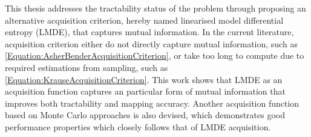 			This thesis addresses the tractability status of the problem through proposing an alternative acquisition criterion, hereby named linearised model differential entropy (LMDE), that captures mutual information. In the current literature, acquisition criterion either do not directly capture mutual information, such as \eqref{Equation:AsherBenderAcquisitionCriterion}, or take too long to compute due to required estimations from sampling, such as \eqref{Equation:KrauseAcquisitionCriterion}. This work shows that LMDE as an acquisition function captures an particular form of mutual information that improves both tractability and mapping accuracy. Another acquisition function based on Monte Carlo approaches is also devised, which demonstrates good performance properties which closely follows that of LMDE acquisition.